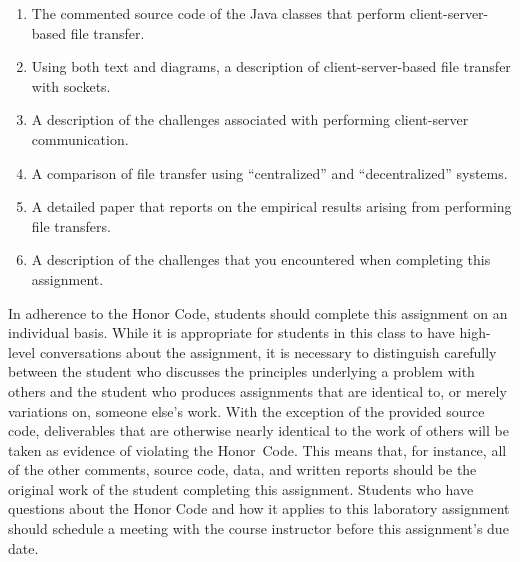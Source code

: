 \begin{enumerate}

    \item The commented source code of the Java classes that perform client-server-based file transfer.

    \item Using both text and diagrams, a description of client-server-based file transfer with sockets.

    \item A description of the challenges associated with performing client-server communication.

    \item A comparison of file transfer using ``centralized'' and ``decentralized'' systems.

    \item A detailed paper that reports on the empirical results arising from performing file transfers.

    \item A description of the challenges that you encountered when completing this assignment.

\end{enumerate}

In adherence to the Honor Code, students should complete this assignment on an individual basis. While it is appropriate
for students in this class to have high-level conversations about the assignment, it is necessary to distinguish
carefully between the student who discusses the principles underlying a problem with others and the student who produces
assignments that are identical to, or merely variations on, someone else's work.  With the exception of the provided
source code, deliverables that are otherwise nearly identical to the work of others will be taken as evidence of
violating the \mbox{Honor Code}. This means that, for instance, all of the other comments, source code, data, and
written reports should be the original work of the student completing this assignment. Students who have questions about
the Honor Code and how it applies to this laboratory assignment should schedule a meeting with the course instructor
before this assignment's due date.


